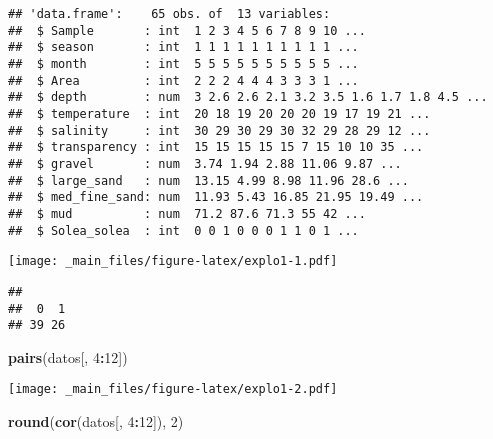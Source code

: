 \documentclass[
]{book}
\newenvironment{Shaded}{\begin{snugshade}}{\end{snugshade}}
\newcommand{\DecValTok}[1]{\textcolor[rgb]{0.00,0.00,0.81}{#1}}
\newcommand{\KeywordTok}[1]{\textcolor[rgb]{0.13,0.29,0.53}{\textbf{#1}}}
\newcommand{\NormalTok}[1]{#1}
\newcommand{\OperatorTok}[1]{\textcolor[rgb]{0.81,0.36,0.00}{\textbf{#1}}}
\begin{document}
\begin{verbatim}
## 'data.frame':    65 obs. of  13 variables:
##  $ Sample       : int  1 2 3 4 5 6 7 8 9 10 ...
##  $ season       : int  1 1 1 1 1 1 1 1 1 1 ...
##  $ month        : int  5 5 5 5 5 5 5 5 5 5 ...
##  $ Area         : int  2 2 2 4 4 4 3 3 3 1 ...
##  $ depth        : num  3 2.6 2.6 2.1 3.2 3.5 1.6 1.7 1.8 4.5 ...
##  $ temperature  : int  20 18 19 20 20 20 19 17 19 21 ...
##  $ salinity     : int  30 29 30 29 30 32 29 28 29 12 ...
##  $ transparency : int  15 15 15 15 15 7 15 10 10 35 ...
##  $ gravel       : num  3.74 1.94 2.88 11.06 9.87 ...
##  $ large_sand   : num  13.15 4.99 8.98 11.96 28.6 ...
##  $ med_fine_sand: num  11.93 5.43 16.85 21.95 19.49 ...
##  $ mud          : num  71.2 87.6 71.3 55 42 ...
##  $ Solea_solea  : int  0 0 1 0 0 0 1 1 0 1 ...
\end{verbatim}

\begin{Shaded}
\end{Shaded}

\texttt{[image: \_main\_files/figure-latex/explo1-1.pdf]}

\begin{Shaded}
\end{Shaded}

\begin{verbatim}
## 
##  0  1 
## 39 26
\end{verbatim}

\begin{Shaded}
\begin{Highlighting}[]
\KeywordTok{pairs}\NormalTok{(datos[, }\DecValTok{4}\OperatorTok{:}\DecValTok{12}\NormalTok{])}
\end{Highlighting}
\end{Shaded}

\texttt{[image: \_main\_files/figure-latex/explo1-2.pdf]}

\begin{Shaded}
\begin{Highlighting}[]
\KeywordTok{round}\NormalTok{(}\KeywordTok{cor}\NormalTok{(datos[, }\DecValTok{4}\OperatorTok{:}\DecValTok{12}\NormalTok{]), }\DecValTok{2}\NormalTok{)}
\end{Highlighting}
\end{Shaded}
\end{document}

